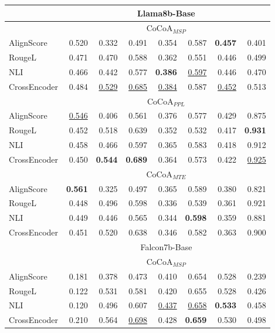 \begin{table*}[h!]
\begin{tabular}{lrrrrrrr}
\rowcolor[gray]{0.9} & \multicolumn{7}{c}{Llama8b-Base} \\

\midrule

& \multicolumn{7}{c}{$\text{CoCoA}_{MSP}$}\\
\midrule

AlignScore & 0.520& 0.332& 0.491& 0.354& 0.587& \textbf{0.457}& 0.401\\
RougeL & 0.471& 0.470& 0.588& 0.362& 0.551& 0.446& 0.499\\
NLI & 0.466& 0.442& 0.577& \textbf{0.386}& \underline{0.597}& 0.446& 0.470\\
CrossEncoder & 0.484& \underline{0.529}& \underline{0.685}& \underline{0.384}& 0.587& \underline{0.452}& 0.513\\

\midrule

& \multicolumn{7}{c}{$\text{CoCoA}_{PPL}$}\\
\midrule

AlignScore & \underline{0.546}& 0.406& 0.561& 0.376& 0.577& 0.429& 0.875\\
RougeL & 0.452& 0.518& 0.639& 0.352& 0.532& 0.417& \textbf{0.931}\\
NLI & 0.458& 0.466& 0.597& 0.365& 0.583& 0.418& 0.912\\
CrossEncoder & 0.450& \textbf{0.544}& \textbf{0.689}& 0.364& 0.573& 0.422& \underline{0.925}\\

\midrule

& \multicolumn{7}{c}{$\text{CoCoA}_{MTE}$}\\
\midrule

AlignScore & \textbf{0.561}& 0.325& 0.497& 0.365& 0.589& 0.380& 0.821\\
RougeL & 0.448& 0.496& 0.598& 0.336& 0.539& 0.361& 0.921\\
NLI & 0.449& 0.446& 0.565& 0.344& \textbf{0.598}& 0.359& 0.881\\
CrossEncoder & 0.451& 0.520& 0.638& 0.346& 0.582& 0.363& 0.900\\
\midrule

\rowcolor[gray]{0.9} & \multicolumn{7}{c}{Falcon7b-Base} \\

\midrule

& \multicolumn{7}{c}{$\text{CoCoA}_{MSP}$}\\
\midrule

AlignScore & 0.181& 0.378& 0.473& 0.410& 0.654& 0.528& 0.239\\
RougeL & 0.122& 0.531& 0.581& 0.420& 0.655& 0.528& 0.426\\
NLI & 0.120& 0.496& 0.607& \underline{0.437}& \underline{0.658}& \textbf{0.533}& 0.458\\
CrossEncoder & 0.210& 0.564& \underline{0.698}& 0.428& \textbf{0.659}& 0.530& 0.498\\


\end{tabular}
\end{table*}
